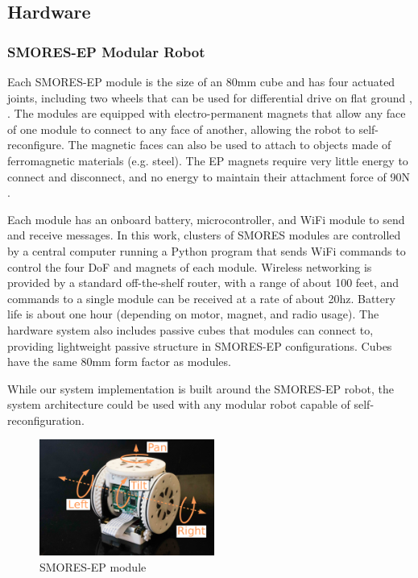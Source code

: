 \documentclass[journal]{IEEEtran}
\begin{document}
%


\subsection{Hardware} %
\label{sec:hardware}
%
\subsubsection{SMORES-EP Modular Robot} \label{sec:smores}
%
Each SMORES-EP module is the size of an 80mm cube
and has four actuated joints, including two wheels that can be
used for differential drive on flat ground \cite{tosun2016design},
\cite{tosun2017paintpots}.  The modules are equipped
with electro-permanent magnets that allow any face of one module to connect to
any face of another, allowing the robot to self-reconfigure. The magnetic faces
can also be used to attach to objects made of ferromagnetic materials (e.g. steel). 
The EP magnets require very little energy to connect and disconnect, and no energy to maintain their attachment force of 90N \cite{tosun2016design}.

Each module has an onboard battery, microcontroller, and WiFi
module to send and receive messages.  In this work, clusters of SMORES
modules are controlled by a central computer running a Python program that
sends WiFi commands to control the four DoF and magnets of each module.
Wireless networking is provided by a standard off-the-shelf  router, with a range of about 100 feet, and commands to a single module can be received at a rate of about 20hz.
Battery life is about one hour (depending on motor, magnet, and radio usage).
The hardware system also includes passive cubes that modules can connect to, providing lightweight passive structure in SMORES-EP configurations.  Cubes have the same 80mm form factor as modules.

While our system implementation is built around the SMORES-EP robot, the system architecture could be used with any modular robot capable of self-reconfiguration. 

%
\begin{figure}   
\begin{center}
\includegraphics[height=1.5in]{images/smores_dof.pdf}
\end{center}
\caption{SMORES-EP module}
\label{fig:smores-module}
\vspace{-3em}
\end{figure}
%
\end{document}
